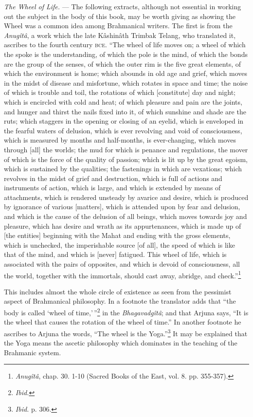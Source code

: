 \documentclass[a4paper, 11pt, oneside, polutonikogreek, english]{article}
\begin{document}
\emph{The Wheel of Life.} --- The following extracts, although not essential in working out the subject in the body of this book, may be worth giving as showing the Wheel was a common idea among Brahmanical writers. The first is from the \emph{Anugîtâ}, a work which the late Kâshinâth Trimbak Telang, who translated it, ascribes to the fourth century \textsc{bce}. ``The wheel of life moves on; a wheel of which the spoke is the understanding, of which the pole is the mind, of which the bonds are the group of the senses, of which the outer rim is the five great elements, of which the environment is home; which abounds in old age and grief, which moves in the midst of disease and misfortune, which rotates in space and time; the noise of which is trouble and toil, the rotations of which [constitute] day and night; which is encircled with cold and heat; of which pleasure and pain are the joints, and hunger and thirst the nails fixed into it, of which sunshine and shade are the ruts; which staggers in the opening or closing of an eyelid, which is enveloped in the fearful waters of delusion, which is ever revolving and void of consciousness, which is measured by months and half-months, is ever-changing, which moves through [all] the worlds; the mud for which is penance and regulations, the mover of which is the force of the quality of passion; which is lit up by the great egoism, which is sustained by the qualities; the fastenings in which are vexations; which revolves in the midst of grief and destruction, which is full of actions and instruments of action, which is large, and which is extended by means of attachments, which is rendered unsteady by avarice and desire, which is produced by ignorance of various [matters], which is attended upon by fear and delusion, and which is the cause of the delusion of all beings, which moves towards joy and pleasure, which has desire and wrath as its appurtenances, which is made up of [the entities] beginning with the Mahat and ending with the gross elements, which is unchecked, the imperishable source [of all], the speed of which is like that of the mind, and which is [never] fatigued. This wheel of life, which is associated with the pairs of opposites, and which is devoid of consciousness, all the world, together with the immortals, should cast away, abridge, and check.''\footnote{\emph{Anugîtâ}, chap. 30. 1-10 (Sacred Books of the East, vol. 8. pp. 355-357).}

This includes almost the whole circle of existence as seen from the pessimist aspect of Brahmanical philosophy. In a footnote the translator adds that ``the body is called `wheel of time,'\,''\footnote{\emph{Ibid.}} in the \emph{Bhagavadgîtâ}; and that Arjuna says, ``It is the wheel that causes the rotation of the wheel of time.'' In another footnote he ascribes to Arjuna the words, ``The wheel is the Yoga.''\footnote{\emph{Ibid.} p. 306.} It may be explained that the Yoga means the ascetic philosophy which dominates in the teaching of the Brahmanic system.
\end{document}
